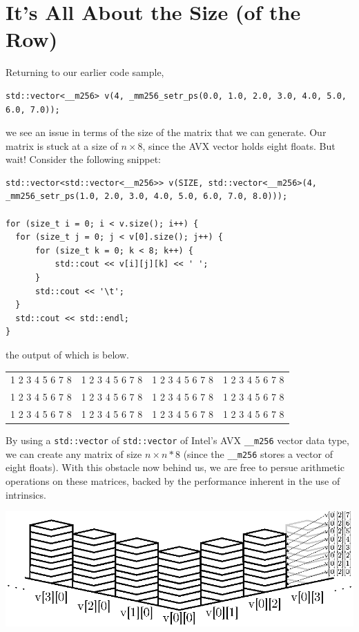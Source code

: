 \documentclass[10pt]{article}
\theoremstyle{definition}
\theoremstyle{plain}
\begin{document}
\section{It's All About the Size (of the Row)}
Returning to our earlier code sample,
\begin{verbatim}
std::vector<__m256> v(4, _mm256_setr_ps(0.0, 1.0, 2.0, 3.0, 4.0, 5.0, 6.0, 7.0));
\end{verbatim}
\noindent we see an issue in terms of the size of the matrix that we can generate. Our matrix is stuck at a size of $n\times 8$, since the AVX vector holds eight floats. But wait! Consider the following snippet:

\begin{verbatim}
std::vector<std::vector<__m256>> v(SIZE, std::vector<__m256>(4, _mm256_setr_ps(1.0, 2.0, 3.0, 4.0, 5.0, 6.0, 7.0, 8.0)));

for (size_t i = 0; i < v.size(); i++) {
  for (size_t j = 0; j < v[0].size(); j++) {
      for (size_t k = 0; k < 8; k++) {
          std::cout << v[i][j][k] << ' ';
      }
      std::cout << '\t';
  }
  std::cout << std::endl;
}
\end{verbatim}
\noindent the output of which is below.

\begin{center}
  \begin{tabular}{c c c c}
    1 2 3 4 5 6 7 8 & 1 2 3 4 5 6 7 8 & 1 2 3 4 5 6 7 8 & 1 2 3 4 5 6 7 8 \\
    1 2 3 4 5 6 7 8 & 1 2 3 4 5 6 7 8 & 1 2 3 4 5 6 7 8 & 1 2 3 4 5 6 7 8 \\
    1 2 3 4 5 6 7 8 & 1 2 3 4 5 6 7 8 & 1 2 3 4 5 6 7 8 & 1 2 3 4 5 6 7 8
  \end{tabular}
\end{center}

By using a \texttt{std::vector} of \texttt{std::vector} of Intel's AVX \texttt{\_\_m256} vector data type, we can create any matrix of size $n\times n*8$ (since the \texttt{\_\_m256} stores a vector of eight floats). With this obstacle now behind us, we are free to persue arithmetic operations on these matrices, backed by the performance inherent in the use of intrinsics.

    \begin{center}
        \includegraphics[width=\textwidth]{images/array_visualization}
    \end{center}
\end{document}
